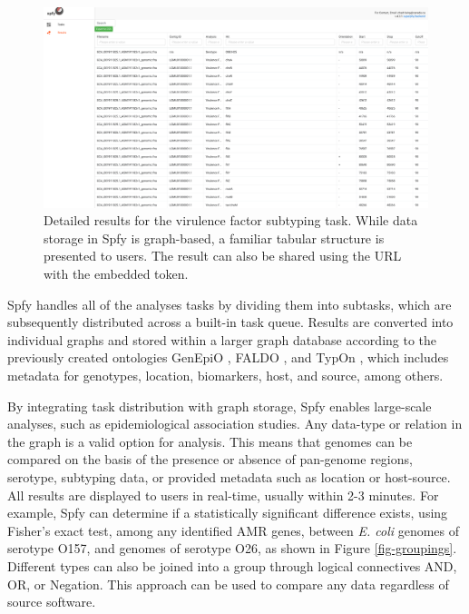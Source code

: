 \documentclass{article}
\begin{document}
\begin{figure}[!htb]
\begin{center}{}
\includegraphics[width=\textwidth]{images/tables.png}
\end{center}
\caption{Detailed results for the virulence factor subtyping task. While data storage in Spfy is graph-based, a familiar tabular structure is presented to users. The result can also be shared using the URL with the embedded token.}
\label{fig-tables}
\end{figure}

Spfy handles all of the analyses tasks by dividing them into subtasks, which are subsequently distributed across a built-in task queue. Results are converted into individual graphs and stored within a larger graph database according to the previously created ontologies GenEpiO \cite{griffiths2017context}, FALDO \cite{bolleman2016faldo}, and TypOn \cite{vaz2014typon}, which includes metadata for genotypes, location, biomarkers, host, and source, among others.

By integrating task distribution with graph storage, Spfy enables large-scale analyses, such as epidemiological association studies. Any data-type or relation in the graph is a valid option for analysis. This means that genomes can be compared on the basis of the presence or absence of pan-genome regions, serotype, subtyping data, or provided metadata such as location or host-source. All results are displayed to users in real-time, usually within 2-3 minutes.
For example, Spfy can determine if a statistically significant difference exists, using Fisher's exact test, among any identified AMR genes, between \textit{E. coli} genomes of serotype O157, and genomes of serotype O26, as shown in Figure \ref{fig-groupings}.
Different types can also be joined into a group through logical connectives AND, OR, or Negation. This approach can be used to compare any data regardless of source software.
\end{document}
